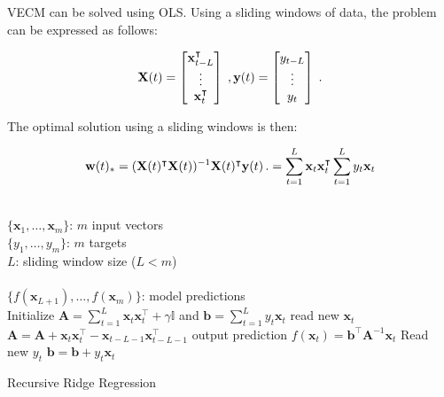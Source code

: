\documentclass{beamer}
\begin{document}
\begin{frame}
VECM can be solved using OLS. Using a sliding windows of data, the problem can be expressed as follows:
 
\[
\mathbf{X}(t) = 
\begin{bmatrix} 
\mathbf{x}_{t-L}^\intercal \\ \vdots \\ \mathbf{x}_t^\intercal
\end{bmatrix} \; , 
{\bf y}(t) = \begin{bmatrix} y_{t-L} \\ \vdots \\ y_t \end{bmatrix} \; .
\]

The optimal solution using a sliding windows is then:

\begin{equation}
{\bf w}(t)_*=({\bf X}(t)^\intercal{\bf X}(t))^{-1}{\bf X}(t)^\intercal{\bf y}(t) \, .
=\displaystyle \sum_{t=1}^L \mathbf{x}_t
\mathbf{x}_t^\intercal \displaystyle \sum_{t=1}^Ly_t \mathbf{x}_t
\end{equation}
\end{frame}


\begin{frame}
\begin{algorithm}[H]
\begin{algorithmic}[1]
\REQUIRE $\,$ \\
$\{\mathbf{x}_1,\dots,\mathbf{x}_m \}$: $m$ input vectors \\
$\{y_1,\dots,y_m \}$: $m$ targets \\
$L$: sliding window size ($L<m$) \\
\ENSURE  $\,$ \\
$\{f(\mathbf{x}_{L+1}),\dots,f(\mathbf{x}_m) \}$: model predictions \\
\STATE Initialize $\mathbf{A}=\displaystyle \sum_{t=1}^L \mathbf{x}_t
\mathbf{x}_t^\intercal + \gamma \mathbb{I}$
and $\mathbf{b}=\displaystyle \sum_{t=1}^Ly_t \mathbf{x}_t$
        \STATE read new $\mathbf{x}_t$
        \STATE $\mathbf{A} = \mathbf{A} + \mathbf{x}_t \mathbf{x}_t^\intercal-
\mathbf{x}_{t-L-1} \mathbf{x}_{t-L-1}^\intercal  $
        \STATE output prediction $f(\mathbf{x}_t) =  \mathbf{b}^\intercal
\mathbf{A}^{-1}\mathbf{x}_t$
        \STATE Read new $y_t$
        \STATE $\mathbf{b} = \mathbf{b} + y_t \mathbf{x}_t$
\ENDFOR

\end{algorithmic}
\caption{Recursive Ridge Regression}
\label{alg:SLAAR}
\end{algorithm}
\end{frame}
\end{document}
